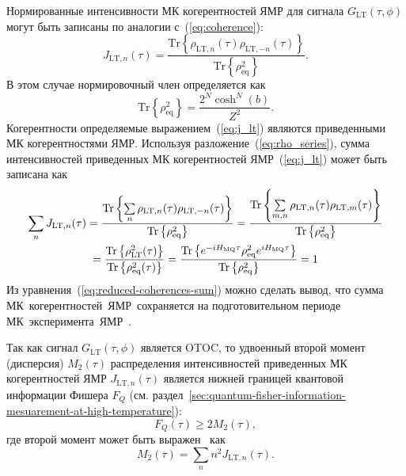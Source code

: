Нормированные интенсивности МК когерентностей ЯМР для сигнала $G_\mathrm{LT}(\tau, \phi)$
могут быть записаны по аналогии с~(\ref{eq:coherence}):
%
\begin{equation}
    \label{eq:j_lt}
    J_{\mathrm{LT}, n}(\tau) =
    \frac{\mathrm{Tr} \left\{
        \rho_{\mathrm{LT},n}(\tau)
        \rho_{\mathrm{LT}, -n}(\tau)
    \right\}}
    {\mathrm{Tr}\left\{\rho^2_\mathrm{eq}\right\}}.
\end{equation}
%
В этом случае нормировочный член определяется как
%
\begin{equation}\label{eq:j_lt_norm}
  \mathrm{Tr}\left\{\rho^2_\mathrm{eq}\right\} =
    \frac{2^N \cosh^N(b)}{Z^2}.
\end{equation}
Когерентности определяемые выражением~(\ref{eq:j_lt})
являются приведенными МК когерентностями ЯМР.
%
Используя разложение~(\ref{eq:rho_series}),
сумма интенсивностей приведенных МК когерентностей ЯМР~(\ref{eq:j_lt}) может быть записана как
%
\begin{multline}\label{eq:reduced-coherences-sum}
  \sum\limits_{n} J_{\mathrm{LT}, n}(\tau)
  = \dfrac{
    \mathrm{Tr} \left\{ 
      \sum\limits_{n}
      \rho_{\mathrm{LT}, n}(\tau)
      \rho_{\mathrm{LT},-n}(\tau) \right\}
    }{
    \mathrm{Tr} \left\{ \rho^2_\mathrm{eq}  \right\}
  }
  = \dfrac{
    \mathrm{Tr} \left\{ 
      \sum\limits_{m,n}
      \rho_{\mathrm{LT}, n}(\tau)
      \rho_{\mathrm{LT}, m}(\tau)
     \right\}}{
    \mathrm{Tr} \left\{ \rho^2_\mathrm{eq} \right\}
  }
  \\
  = \dfrac{
    \mathrm{Tr} \left\{ \rho_\mathrm{LT}^2(\tau) \right\}
  }{
    \mathrm{Tr} \left\{ \rho^2_\mathrm{eq}(\tau) \right\}
  }
  = \dfrac{
    \mathrm{Tr} \left\{ 
      e^{-i H_\mathrm{MQ} \tau}
      \rho^{2}_\mathrm{eq}
      e^{i H_\mathrm{MQ} \tau}
     \right\}
  }{
    \mathrm{Tr} \left\{  \rho^2_\mathrm{eq} \right\}
  }
  = 1
\end{multline}
%
Из уравнения~(\ref{eq:reduced-coherences-sum}) можно сделать вывод, что сумма МК~когерентностей~ЯМР~сохраняется на подготовительном периоде МК~эксперимента~ЯМР~\cite{Baum1985}.


Так как сигнал $G_\mathrm{LT}(\tau, \phi)$ является OTOC,
то удвоенный второй момент (дисперсия) $M_2(\tau)$ распределения интенсивностей приведенных МК когерентностей ЯМР $J_{\mathrm{LT}, n} (\tau)$
является нижней границей квантовой информации Фишера $F_{Q}$
(см. раздел~\ref{sec:quantum-fisher-information-mesuarement-at-high-temperature}):
\begin{equation}\label{eq:fisher-low-bound}
  F_{Q}(\tau) \geq 2M_2(\tau),
\end{equation}
где второй момент может быть выражен~\cite{Khitrin1997} как
%
\begin{equation}\label{eq:m2-via-coherences}
  M_2(\tau) = \sum\limits_n n^2 J_{\mathrm{LT}, n} (\tau).
\end{equation}

